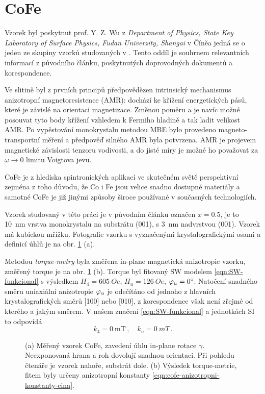 \section{CoFe}
\label{chap:vzorek-cofe}

Vzorek byl poskytnut prof. Y. Z. Wu z \emph{Department of Physics, State Key Laboratory of Surface Physics, Fudan Univerzity, Shangai} v Číněa jedná se o jeden ze skupiny vzorků studovaných v \cite{zengIntrinsicMechanismAnisotropic2020}.
Tento oddíl je souhrnem relevantních informací z původního článku, poskytnutých doprovodných dokumentů a korespondence.

Ve slitině  byl z prvních principů předpovědězen intrinsický mechanismus anizotropní magnetoresistence (AMR): dochází ke křížení energetických pásů, které je závislé na orientaci magnetizace.
Změnou poměru  a  je navíc možné posouvat tyto body křížení vzhledem k Fermiho hladině a tak ladit velikost AMR.
Po vypěstování monokrystalu metodou MBE bylo provedeno magneto-transportní měření a předpověď silného AMR byla potvrzena.
AMR je projevem magnetické závislosti tenzoru vodivosti, a do jisté míry je možné ho považovat za $\omega\to 0$ limitu Voigtova jevu.

CoFe je z hlediska spintronických aplikací ve skutečném světě perspektivní zejména z toho důvodu, že Co i Fe jsou velice snadno dostupné materiály a samotné CoFe je již jinými způsoby široce používané v současných technologiích.

Vzorek studovaný v této práci je v původním článku označen $x=0.5$, je to \SI{10}{\nano\meter} vrstva monokrystalu  na substrátu (001), s \SI{3}{\nano\meter} nadvrstvou (001).
Vzorek má kubickou mřížku.
Fotografie vzorku s vyznačenými krystalografickými osami a definicí úhlů je na obr. \ref{fig:vzorek-cofe} (a).

Metodou \emph{torque-metry} byla změřena in-plane magnetická anizotropie vzorku, změřený torque je na obr. \ref{fig:vzorek-cofe} (b).
Torque byl fitovaný SW modelem \eqref{eqn:SW-funkcional} s výsledkem $H_4=\SI{605}{Oe}$, $H_u=\SI{126}{Oe}$, $\varphi_u=\SI{0}{\degree}$.
Natočení snadného směru uniaxiální anizotropie $\varphi_u$ je odečítáno od jednoho z hlavních krystalografických směrů [100] nebo [010], z korespondence však není zřejmé od kterého a jakým směrem.
V našem značení \eqref{eqn:SW-funkcional} a jednotkách SI to odpovídá
\begin{equation}
\label{eqn:cofe-anizotropni-konstanty-cina}
    k_4 = \SI{0}{\milli\tesla} \,,\quad k_u = \SI{0}{mT} \,.
\end{equation}

\begin{figure}[htbp]
    \centering
    
    \caption{(a) Měřený vzorek CoFe, zavedení úhlu in-plane rotace $\gamma$. Neexponovaná hrana a roh dovolují snadnou orientaci. Při pohledu čtenáře je vzorek nahoře, substrát dole. (b) Výsledek torque-metrie, fitem byly určeny anizotropní konstanty \eqref{eqn:cofe-anizotropni-konstanty-cina}.}
    \label{fig:vzorek-cofe}
\end{figure}
